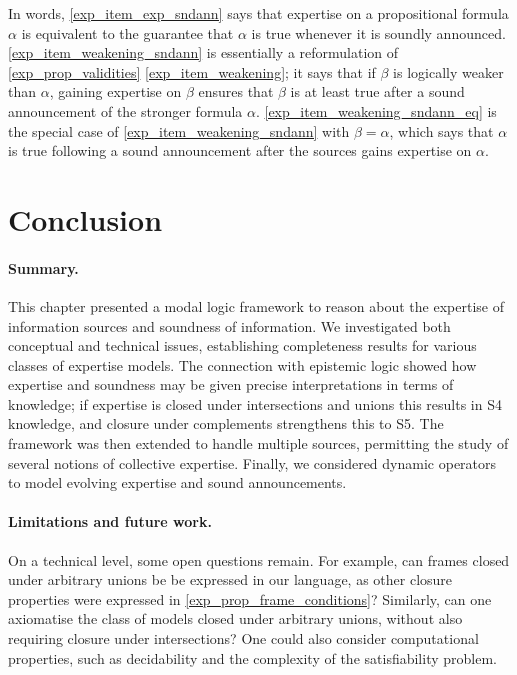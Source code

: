 In words, \cref{exp_item_exp_sndann} says that expertise on a propositional
formula $\alpha$ is equivalent to the guarantee that $\alpha$ is true whenever
it is soundly announced. \cref{exp_item_weakening_sndann} is essentially a
reformulation of \cref{exp_prop_validities} \cref{exp_item_weakening}; it says that
if $\beta$ is logically weaker than $\alpha$, gaining expertise on $\beta$
ensures that $\beta$ is at least true after a sound announcement of the
stronger formula $\alpha$.  \cref{exp_item_weakening_sndann_eq} is the special
case of \cref{exp_item_weakening_sndann} with $\beta = \alpha$, which says that
$\alpha$ is true following a sound announcement after the sources gains
expertise on $\alpha$.

\section{Conclusion}
\label{exp_sec_conclusion}

\paragraph{Summary.} This chapter presented a modal logic framework to
reason about the expertise of information sources and soundness of information.
We investigated both conceptual and technical issues, establishing
completeness results for various classes of expertise models. The connection with
epistemic logic showed how expertise and soundness may be given precise
interpretations in terms of knowledge; if expertise is closed under
intersections and unions this results in S4 knowledge, and closure under
complements strengthens this to S5. The framework was then extended to handle
multiple sources, permitting the study of several notions of collective
expertise. Finally, we considered dynamic operators to model evolving expertise
and sound announcements.

\paragraph{Limitations and future work.}

On a technical level, some open questions remain. For example, can frames
closed under arbitrary unions be be expressed in our language, as other closure
properties were expressed in \cref{exp_prop_frame_conditions}? Similarly, can
one axiomatise the class of models closed under arbitrary unions, without also
requiring closure under intersections? One could also consider computational
properties, such as decidability and the complexity of the satisfiability
problem.

